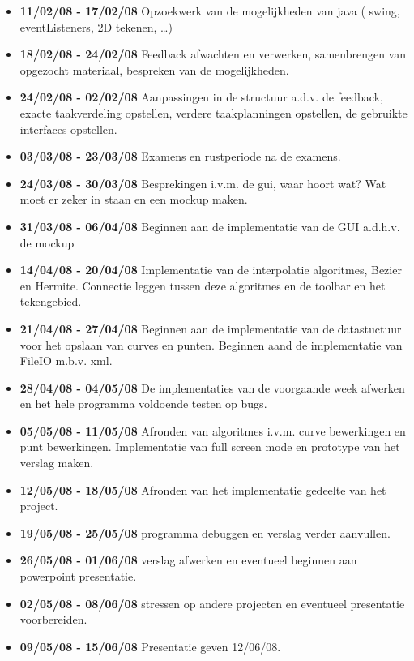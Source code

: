\documentclass[a4paper,11pt,oneside, titlepage]{article}
\begin{document}
\begin{itemize}
\item \textbf{11/02/08 - 17/02/08}\newline
Opzoekwerk van de mogelijkheden van java ( swing, eventListeners, 2D tekenen, \ldots )
\item \textbf{18/02/08 - 24/02/08}\newline
Feedback afwachten en verwerken, samenbrengen van opgezocht materiaal, bespreken
van de mogelijkheden.
\item \textbf{24/02/08 - 02/02/08}\newline
Aanpassingen in de structuur a.d.v. de feedback, exacte taakverdeling opstellen, verdere
taakplanningen opstellen, de gebruikte interfaces opstellen.
\item \textbf{03/03/08 - 23/03/08}\newline
Examens en rustperiode na de examens.
\item \textbf{24/03/08 - 30/03/08}\newline
Besprekingen i.v.m. de gui, waar hoort wat? Wat moet er zeker in staan en een mockup maken.
\item \textbf{31/03/08 - 06/04/08}\newline
Beginnen aan de implementatie van de GUI a.d.h.v. de mockup
\item \textbf{14/04/08 - 20/04/08}\newline
Implementatie van de interpolatie algoritmes, Bezier en Hermite.
Connectie leggen tussen deze algoritmes en de toolbar en het tekengebied.
\item \textbf{21/04/08 - 27/04/08}\newline
Beginnen aan de implementatie van de datastuctuur voor het opslaan van curves en punten.
Beginnen aand de implementatie van FileIO m.b.v. xml.
\item \textbf{28/04/08 - 04/05/08}\newline
De implementaties van de voorgaande week afwerken en het hele programma voldoende testen
op bugs.
\item \textbf{05/05/08 - 11/05/08}\newline
Afronden van algoritmes i.v.m. curve bewerkingen en punt bewerkingen.
Implementatie van full screen mode en prototype van het verslag maken.
\item \textbf{12/05/08 - 18/05/08}\newline
Afronden van het implementatie gedeelte van het project.
\item \textbf{19/05/08 - 25/05/08}\newline
programma debuggen en verslag verder aanvullen.
\item \textbf{26/05/08 - 01/06/08}\newline
verslag afwerken en eventueel beginnen aan powerpoint presentatie.
\item \textbf{02/05/08 - 08/06/08}\newline
stressen op andere projecten en eventueel presentatie voorbereiden.
\item \textbf{09/05/08 - 15/06/08}\newline
Presentatie geven 12/06/08.
\end{itemize}
\newpage
\end{document}
